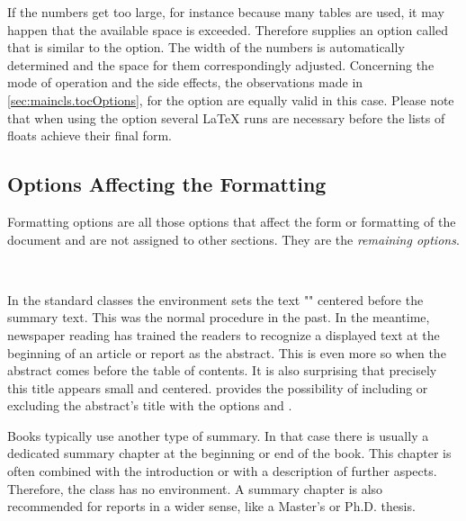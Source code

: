 If the numbers get too large, for instance because many tables are used, it
may happen that the available space is exceeded. Therefore \KOMAScript{}
supplies an option called  that is similar to the
 option. The width of the numbers is automatically determined
and the space for them correspondingly adjusted. Concerning the mode of
operation and the side effects, the observations made in
\autoref{sec:maincls.tocOptions}, 
for the  option are equally valid in this case. Please note
that when using the  option several \LaTeX{} runs are
necessary before the lists of floats achieve their final form.
%
%
%



\subsection{Options Affecting the Formatting}
\label{sec:maincls.formattingOptions}

Formatting options are all those options that affect the form or
formatting of the document and are not assigned to other sections.
They are the \emph{remaining options}.

\begin{Declaration}
  \\
\end{Declaration}%
%
%
In the standard classes
the  environment sets the text "\abstractname"
centered before the summary text. This was the
normal procedure in the past. In the meantime, newspaper reading has
trained the readers to recognize a displayed text at the beginning of
an article or report as the abstract. This is even more so when the
abstract comes before the table of contents. It is also surprising
that precisely this title appears small and centered. {\KOMAScript}
provides the possibility of including or excluding the abstract's
title with the options  and .

\begin{Explain}
  Books typically use another type of summary. In that case there is
  usually a dedicated summary chapter at the beginning or end of the
  book. This chapter is often combined with the introduction or with a
  description of further aspects. Therefore, the class 
  has no  environment. A summary chapter is also
  recommended for reports in a wider sense, like a Master's or Ph.D.
  thesis.
\end{Explain}
%
%
%


